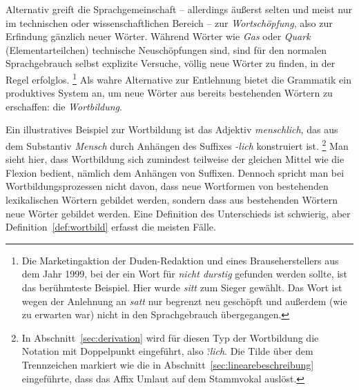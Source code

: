 \begin{exe}
  \ex \label{ex:abgrenzungvonflexionundwortbildung030}
  \begin{xlist}
  \end{xlist}
\end{exe}

Alternativ greift die Sprachgemeinschaft -- allerdings äußerst selten und meist nur im technischen oder wissenschaftlichen Bereich -- zur \textit{Wortschöpfung}, also zur Erfindung gänzlich neuer Wörter.
Während Wörter wie \textit{Gas} oder \textit{Quark} (Elementarteilchen) technische Neuschöpfungen sind, sind für den normalen Sprachgebrauch selbst explizite Versuche, völlig neue Wörter zu finden, in der Regel erfolglos.%
\footnote{Die Marketingaktion der Duden-Redaktion und eines Brauseherstellers aus dem Jahr 1999, bei der ein Wort für \textit{nicht durstig} gefunden werden sollte, ist das berühmteste Beispiel.
Hier wurde \textit{sitt} zum Sieger gewählt.
Das Wort ist wegen der Anlehnung an \textit{satt} nur begrenzt neu geschöpft und außerdem (wie zu erwarten war) nicht in den Sprachgebrauch übergegangen.}
Als wahre Alternative zur Entlehnung bietet die Grammatik ein produktives System an, um neue Wörter aus bereits bestehenden Wörtern zu erschaffen: die \textit{Wortbildung}.

Ein illustratives Beispiel zur Wortbildung ist \zB das Adjektiv \textit{menschlich}, das aus dem Substantiv \textit{Mensch} durch Anhängen des Suffixes \textit{-lich} konstruiert ist.%
\footnote{In Abschnitt~\ref{sec:derivation} wird für diesen Typ der Wortbildung die Notation mit Doppelpunkt eingeführt, also \textit{\~:lich}.
Die Tilde über dem Trennzeichen markiert wie die in Abschnitt~\ref{sec:linearebeschreibung} eingeführte, dass das Affix Umlaut auf dem Stammvokal auslöst.}
Man sieht hier, dass Wortbildung sich zumindest teilweise der gleichen Mittel wie die Flexion bedient, nämlich \zB dem Anhängen von Suffixen.
Dennoch spricht man bei Wortbildungsprozessen nicht davon, dass neue Wortformen von bestehenden lexikalischen Wörtern gebildet werden, sondern dass aus bestehenden Wörtern neue Wörter gebildet werden.
Eine Definition des Unterschieds ist schwierig, aber Definition~\ref{def:wortbild} erfasst die meisten Fälle.

